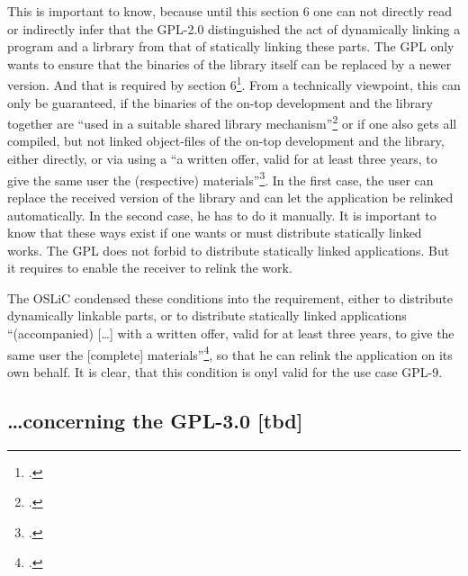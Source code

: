 \begin{itemize}
  This is important to know, because until this section 6 one can not directly
  read or indirectly infer that the GPL-2.0 distinguished the act of
  dynamically linking a program and a lirbrary from that of statically linking
  these parts. The GPL only wants to ensure that the binaries of the library
  itself can be replaced by a newer version. And that is required by section
  6\footcite[cf.][\nopage wp.\ §6]{Gpl20OsiLicense1991a}.
  From a technically viewpoint, this can only be guaranteed, if the binaries of
  the on-top development and the library together are \enquote{used in a
  suitable shared library mechanism}\footcite[cf.][\nopage wp.\
  §6]{Gpl20OsiLicense1991a} or if one also gets all compiled, but not linked
  object-files of the on-top development and the library, either directly, or
  via using a \enquote{a written offer, valid for at least three years, to give
  the same user the (respective) materials}\footcite[cf.][\nopage wp.\
  §6]{Gpl20OsiLicense1991a}. In the first case, the user can replace the
  received version of the library and can let the application be relinked
  automatically. In the second case, he has to do it manually. It is important
  to know that these ways exist if one wants or must distribute statically
  linked works. The GPL does not forbid to distribute statically linked
  applications. But it requires to enable the receiver to relink the work.
  
  The OSLiC condensed these conditions into the requirement, either to
  distribute dynamically linkable parts, or to distribute statically linked
  applications \enquote{(accompanied) [\ldots] with a written offer, valid for
  at least three years, to give the same user the [complete]
  materials}\footcite[cf.][\nopage wp.\ §6]{Gpl20OsiLicense1991a}, so that he
  can relink the application on its own behalf. It is clear, that this condition
  is onyl valid for the use case GPL-9.
  

\end{itemize}


\subsection{\ldots concerning the GPL-3.0 [tbd]}





%
